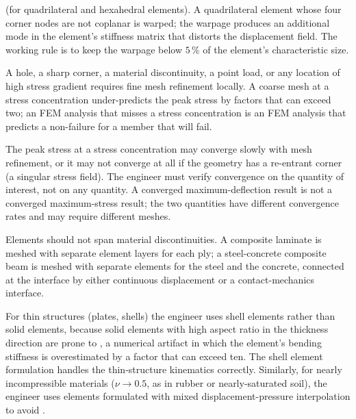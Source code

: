  (for quadrilateral and hexahedral
elements). A quadrilateral element whose four corner nodes are
not coplanar is warped; the warpage produces an additional
mode in the element's stiffness matrix that distorts the
displacement field. The working rule is to keep the warpage
below $5\,\%$ of the element's characteristic size.

 A hole, a
sharp corner, a material discontinuity, a point load, or any
location of high stress gradient requires fine mesh refinement
locally. A coarse mesh at a stress concentration under-predicts
the peak stress by factors that can exceed two; an FEM analysis
that misses a stress concentration is an FEM analysis that
predicts a non-failure for a member that will fail.

 The peak stress
at a stress concentration may converge slowly with mesh
refinement, or it may not converge at all if the geometry has a
re-entrant corner (a singular stress field). The engineer must
verify convergence on the quantity of interest, not on any
quantity. A converged maximum-deflection result is not a
converged maximum-stress result; the two quantities have different
convergence rates and may require different meshes.

 Elements should not span
material discontinuities. A composite laminate is meshed with
separate element layers for each ply; a steel-concrete composite
beam is meshed with separate elements for the steel and the
concrete, connected at the interface by either continuous
displacement or a contact-mechanics interface.

 For thin structures (plates, shells)
the engineer uses shell elements rather than solid elements,
because solid elements with high aspect ratio in the thickness
direction are prone to , a numerical
artifact in which the element's bending stiffness is overestimated
by a factor that can exceed ten. The shell element formulation
handles the thin-structure kinematics correctly. Similarly, for
nearly incompressible materials ($\nu \to 0.5$, as in rubber or
nearly-saturated soil), the engineer uses elements formulated with
mixed displacement-pressure interpolation to avoid
.



